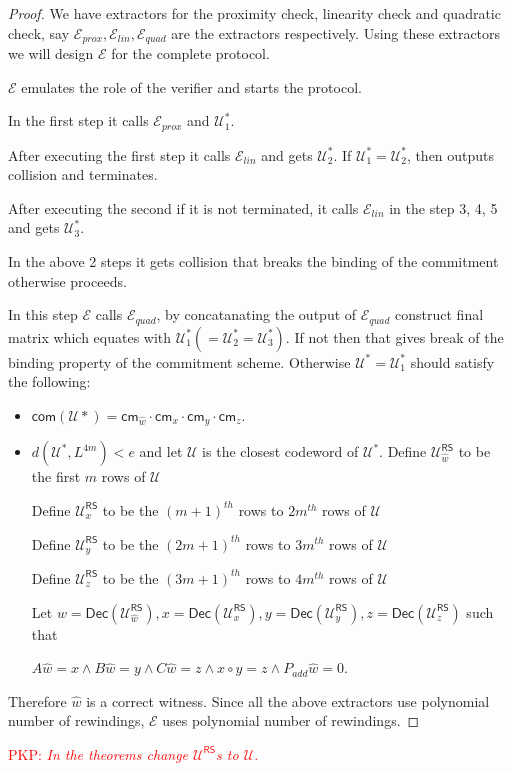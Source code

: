 \documentclass[runningheads]{llncs}
\newcommand{\pnote}[1] {\textcolor{red}  {PKP: \sl{#1}}}
\def\extrac{\mathcal{E}}
\def\RS{\mathsf{RS}} %
\def\cm{\mathsf{cm}} %
\def\com{\mathsf{com}} %
\def\extwit{\hat{w}} %
\def\oracle{\mathcal{U}^{\RS}}
\def\dec{\mathsf{Dec}}
\def\calU{\mathcal{U}}
\begin{document}
	\begin{proof}
		We have extractors for the proximity check, linearity check and quadratic check, say $\extrac_{prox}, \extrac_{lin}, \extrac_{quad}$ are the extractors respectively. Using these extractors we will design  $\extrac$ for the complete protocol. 
		
		$\extrac$ emulates the role of the verifier and starts the protocol. 
		
		In the first step it calls $\extrac_{prox}$ and $\calU_1^*$.
		
		After executing the first step it calls $\extrac_{lin}$ and gets $\calU_2^*$. If $\calU_1^* = \calU_2^*$, then outputs collision and terminates.
		
		After executing the second if it is not terminated, it calls $\extrac_{lin}$ in the step 3, 4, 5 and gets $\calU_3^*$. 
		
		In the above 2 steps it gets collision that breaks the binding of the commitment otherwise proceeds.
		
		In this step $\extrac$ calls $\extrac_{quad}$, by concatanating the output of $\extrac_{quad}$ construct final matrix which equates with $\calU_1^* (=\calU_2^*=\calU_3^*)$. If not then that gives break of the binding property of the commitment scheme. Otherwise $\calU^*=\calU_1^*$ should satisfy the following:
		\begin{itemize}
			\item $\com(\calU*)=\cm_{\extwit}\cdot\cm_x\cdot\cm_y\cdot\cm_z$.
			\item $d(\calU^*,L^{4m}) < e$ and let $\calU$ is the closest codeword of $\calU^*$. Define $\oracle_{\extwit}$ to be the first $m$ rows of $\calU$
			
			Define $\oracle_{x}$ to be the $(m+1)^{th}$ rows to $2m^{th}$ rows of $\calU$
			
			Define $\oracle_{y}$ to be the $(2m+1)^{th}$ rows to $3m^{th}$ rows of $\calU$
			
			Define $\oracle_{z}$ to be the $(3m+1)^{th}$ rows to $4m^{th}$ rows of $\calU$
			
			Let $w= \dec(\oracle_{\extwit}), x=\dec(\oracle_x), y=\dec(\oracle_y), z=\dec(\oracle_z)$ such that
			
			$A\extwit = x \wedge B \extwit = y \wedge C \extwit = z \wedge x\circ y =z \wedge P_{add} \extwit = 0$.
		\end{itemize}
		Therefore $\extwit$ is a correct witness. Since all the above extractors use polynomial number of rewindings, $\extrac$ uses polynomial number of rewindings.		
	\end{proof}
	\pnote{In the theorems change $\oracle$s to $\calU$.}
\end{document}
